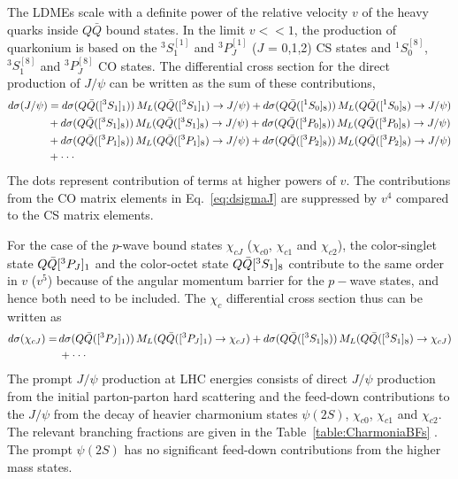 \documentclass[aps,prc,preprint,superscriptaddress,showpacs,showkeys,amsmath]{revtex4-1}
\begin{document}
   The LDMEs scale with a definite power of the relative velocity $v$ of the 
heavy quarks inside $Q\bar Q$ bound states. In the limit $v<<1$, the production of 
quarkonium is based on the $^3S_1^{[1]}$ and $^3P_J^{[1]}$ ($J$ = 0,1,2) CS states 
and $^1S_0^{[8]}$, $^3S_1^{[8]}$ and $^3P_J^{[8]}$ CO states. The differential 
cross section for the direct production of $J/\psi$ can be written as the 
sum of these contributions,
\begin{equation}
\begin{split}
d\sigma(J/\psi) &= d\sigma(Q{\bar{Q}}([^3S_1]_{1}))
                   \,M_{L}(Q{\bar{Q}}([^3S_1]_{1})\rightarrow J/\psi) 
                +  d\sigma(Q{\bar{Q}}([^1S_0]_{8}))
                   \,M_{L}(Q{\bar{Q}}([^1S_0]_{8})\rightarrow J/\psi)\\ 
                &+  d\sigma(Q{\bar{Q}}([^3S_1]_{8}))
                   \,M_{L}(Q{\bar{Q}}([^3S_1]_{8})\rightarrow J/\psi) 
                +  d\sigma(Q{\bar{Q}}([^3P_0]_{8}))
                   \,M_{L}(Q{\bar{Q}}([^3P_0]_{8})\rightarrow J/\psi)\\ 
                &+  d\sigma(Q{\bar{Q}}([^3P_1]_{8}))
                   \,M_{L}(Q{\bar{Q}}([^3P_1]_{8})\rightarrow J/\psi)
                +  d\sigma(Q{\bar{Q}}([^3P_2]_{8}))
                   \,M_{L}(Q{\bar{Q}}([^3P_2]_{8})\rightarrow J/\psi)\\
                &+ \cdot\cdot\cdot  
\label{eq:dsigmaJ}
\end{split}
\end{equation}
  The dots represent contribution of terms at higher powers of $v$. The 
contributions from the CO matrix elements in Eq.~\ref{eq:dsigmaJ} are suppressed 
by $v^4$ compared to the CS matrix elements.


  For the case of the $p$-wave bound states $\chi_{cJ}$ ($\chi_{c0}$, $\chi_{c1}$ 
and $\chi_{c2}$), the color-singlet state $Q{\bar{Q}}[^3P_J]_{1}$ and the color-octet 
state $Q{\bar{Q}}[^3S_1]_{8}$ contribute to the same order in $v$ ($v^{5}$) because of 
the angular momentum barrier for the $p-$wave states, and hence both need to be included. 
The $\chi_{c}$ differential cross section thus can be written as 
\begin{equation}
\begin{split}
d\sigma(\chi_{cJ}) =\,&d\sigma(Q{\bar{Q}}([^3P_J]_{1}))
                   \,M_{L}(Q{\bar{Q}}([^3P_J]_{1})\rightarrow \chi_{cJ}) 
                +  d\sigma(Q{\bar{Q}}([^3S_1]_{8}))
                   \,M_{L}(Q{\bar{Q}}([^3S_1]_{8})\rightarrow \chi_{cJ})\\
                &+ \cdot\cdot\cdot  
\label{eq:dsigmachi}
\end{split}
\end{equation}
  The prompt $J/\psi$ production at LHC energies consists of direct $J/\psi$ 
production from the initial parton-parton hard scattering and the feed-down contributions 
to the $J/\psi$ from the decay of heavier charmonium states $\psi(2S)$, 
$\chi_{c0}$, $\chi_{c1}$ and $\chi_{c2}$.  The relevant branching fractions are given 
in the Table~\ref{table:CharmoniaBFs} \cite{Nakamura:2010zzi}. 
The prompt $\psi(2S)$ has no significant feed-down contributions from the higher mass states. 
\end{document}
